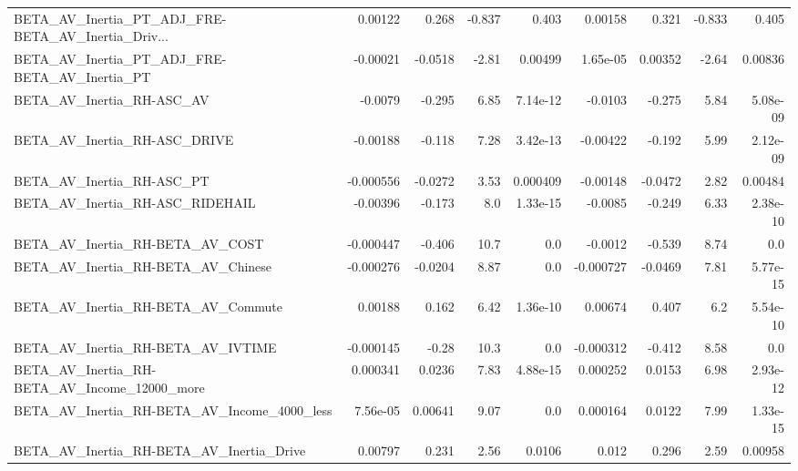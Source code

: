 \begin{tabular}{lrrrrrrrr}
BETA\_AV\_Inertia\_PT\_ADJ\_FRE-BETA\_AV\_Inertia\_Driv... &     0.00122 &        0.268 &   -0.837 &    0.403 &    0.00158 &       0.321 &       -0.833 &         0.405 \\
BETA\_AV\_Inertia\_PT\_ADJ\_FRE-BETA\_AV\_Inertia\_PT      &    -0.00021 &      -0.0518 &    -2.81 &  0.00499 &   1.65e-05 &     0.00352 &        -2.64 &       0.00836 \\
BETA\_AV\_Inertia\_RH-ASC\_AV                          &     -0.0079 &       -0.295 &     6.85 & 7.14e-12 &    -0.0103 &      -0.275 &         5.84 &      5.08e-09 \\
BETA\_AV\_Inertia\_RH-ASC\_DRIVE                       &    -0.00188 &       -0.118 &     7.28 & 3.42e-13 &   -0.00422 &      -0.192 &         5.99 &      2.12e-09 \\
BETA\_AV\_Inertia\_RH-ASC\_PT                          &   -0.000556 &      -0.0272 &     3.53 & 0.000409 &   -0.00148 &     -0.0472 &         2.82 &       0.00484 \\
BETA\_AV\_Inertia\_RH-ASC\_RIDEHAIL                    &    -0.00396 &       -0.173 &      8.0 & 1.33e-15 &    -0.0085 &      -0.249 &         6.33 &      2.38e-10 \\
BETA\_AV\_Inertia\_RH-BETA\_AV\_COST                    &   -0.000447 &       -0.406 &     10.7 &      0.0 &    -0.0012 &      -0.539 &         8.74 &           0.0 \\
BETA\_AV\_Inertia\_RH-BETA\_AV\_Chinese                 &   -0.000276 &      -0.0204 &     8.87 &      0.0 &  -0.000727 &     -0.0469 &         7.81 &      5.77e-15 \\
BETA\_AV\_Inertia\_RH-BETA\_AV\_Commute                 &     0.00188 &        0.162 &     6.42 & 1.36e-10 &    0.00674 &       0.407 &          6.2 &      5.54e-10 \\
BETA\_AV\_Inertia\_RH-BETA\_AV\_IVTIME                  &   -0.000145 &        -0.28 &     10.3 &      0.0 &  -0.000312 &      -0.412 &         8.58 &           0.0 \\
BETA\_AV\_Inertia\_RH-BETA\_AV\_Income\_12000\_more       &    0.000341 &       0.0236 &     7.83 & 4.88e-15 &   0.000252 &      0.0153 &         6.98 &      2.93e-12 \\
BETA\_AV\_Inertia\_RH-BETA\_AV\_Income\_4000\_less        &    7.56e-05 &      0.00641 &     9.07 &      0.0 &   0.000164 &      0.0122 &         7.99 &      1.33e-15 \\
BETA\_AV\_Inertia\_RH-BETA\_AV\_Inertia\_Drive           &     0.00797 &        0.231 &     2.56 &   0.0106 &      0.012 &       0.296 &         2.59 &       0.00958 \\

\end{tabular}
